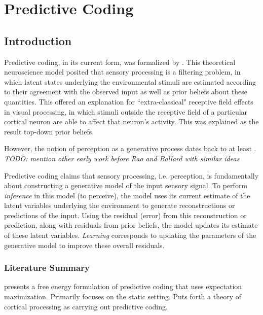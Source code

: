 \chapter{Predictive Coding}

\section{Introduction}

Predictive coding, in its current form, was formalized by \cite{rao1999predictive}. This theoretical neuroscience model posited that sensory processing is a filtering problem, in which latent states underlying the environmental stimuli are estimated according to their agreement with the observed input as well as prior beliefs about these quantities. This offered an explanation for ``extra-classical" receptive field effects in visual processing, in which stimuli outside the receptive field of a particular cortical neuron are able to affect that neuron's activity. This was explained as the result top-down prior beliefs.

However, the notion of perception as a generative process dates back to at least \cite{von1867handbuch}. \textit{TODO: mention other early work before Rao and Ballard with similar ideas}

Predictive coding claims that sensory processing, i.e. perception, is fundamentally about constructing a generative model of the input sensory signal. To perform \textit{inference} in this model (to perceive), the model uses its current estimate of the latent variables underlying the environment to generate reconstructions or predictions of the input. Using the residual (error) from this reconstruction or prediction, along with residuals from prior beliefs, the model updates its estimate of these latent variables. \textit{Learning} corresponds to updating the parameters of the generative model to improve these overall residuals.
\newline

\subsection{Literature Summary}

\noindent \cite{friston2002functional, friston2003learning, friston2005theory} presents a free energy formulation of predictive coding that uses expectation maximization. Primarily focuses on the static setting. Puts forth a theory of cortical processing as carrying out predictive coding.
\newline


